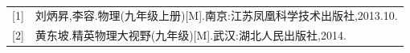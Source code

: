 \documentclass[10.5pt]{article}
\begin{document}
\newpage
{}\\
\begin{table}[htbp]%
	\centering
	\begin{tabular}{c|l}
		\toprule[1pt]
		{\small [1]}&{\small 刘炳昇,李容.物理(九年级上册)[M].南京:江苏凤凰科学技术出版社,2013.10.}\\
		{\small [2]}&{\small 黄东坡.精英物理大视野(九年级)[M].武汉:湖北人民出版社,2014.}\\
		\bottomrule[1pt]
	\end{tabular}
\end{table}
\end{document}
